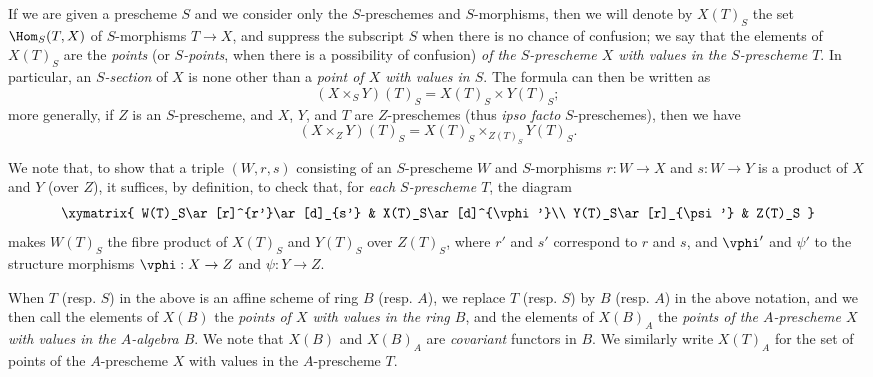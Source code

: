 \begin{env}[3.4.3]
\label{I.3.4.3}
If we are given a prescheme $S$ and we consider only the $S$-preschemes and $S$-morphisms,
then we will denote by $X(T)_S$ the set $\Hom_S(T,X)$ of $S$-morphisms $T\to X$, and suppress
the subscript $S$ when there is no chance of confusion; we say that the elements of $X(T)_S$
are the \emph{points} (or \emph{$S$-points}, when there is a possibility of confusion)
\emph{of the $S$-prescheme $X$ with values in the $S$-prescheme $T$}. In particular, an
\emph{$S$-section} of $X$ is none other than a \emph{point of $X$ with values in $S$}. The
formula  can then be written as
\[
\label{I.3.4.3.1}
  (X\times_S Y)(T)_S=X(T)_S\times Y(T)_S;
  \tag{3.4.3.1}
\]
more generally, if $Z$ is an $S$-prescheme, and $X$, $Y$, and $T$ are $Z$-preschemes (thus
\emph{ipso facto} $S$-preschemes), then we have
\[
\label{I.3.4.3.2}
  (X\times_Z Y)(T)_S=X(T)_S\times_{Z(T)_S}Y(T)_S.
  \tag{3.4.3.2}
\]

We note that, to show that a triple $(W,r,s)$ consisting of an $S$-prescheme $W$ and
$S$-morphisms $r:W\to X$ and $s:W\to Y$ is a product of $X$ and $Y$ (over $Z$), it suffices, by
definition, to check that, for \emph{each $S$-prescheme $T$}, the diagram
\[
  \xymatrix{
    W(T)_S\ar[r]^{r'}\ar[d]_{s'} &
    X(T)_S\ar[d]^{\vphi'}\\
    Y(T)_S\ar[r]_{\psi'} &
    Z(T)_S
  }
\]
makes $W(T)_S$ the fibre product of $X(T)_S$ and $Y(T)_S$ over $Z(T)_S$, where $r'$ and $s'$
correspond to $r$ and $s$, and $\vphi'$ and $\psi'$ to the structure morphisms $\vphi:X\to Z$ and $\psi:Y\to Z$.
\end{env}

\begin{env}[3.4.4]
\label{I.3.4.4}
When $T$ (resp. $S$) in the above is an affine scheme of ring $B$ (resp. $A$), we replace
$T$ (resp. $S$) by $B$ (resp. $A$) in the above notation, and we then call the elements of
$X(B)$ the \emph{points of $X$ with values in the ring $B$}, and the elements of $X(B)_A$ the
\emph{points of the $A$-prescheme $X$ with values in the $A$-algebra $B$}. We note that
$X(B)$ and $X(B)_A$ are \emph{covariant} functors in $B$. We similarly write $X(T)_A$ for the
set of points of the $A$-prescheme $X$ with values in the $A$-prescheme $T$.
\end{env}

